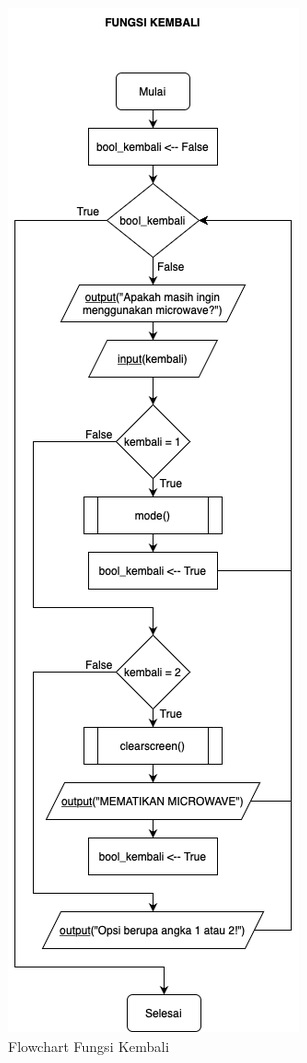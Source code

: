 \documentclass[conference]{IEEEtran}
\begin{document}
\begin{figure}[htbp]
    \centering
    \def\svgwidth{\columnwidth}
    \centerline{\includegraphics[scale=0.45]{Kembali.png}}
    \caption{Flowchart Fungsi Kembali}
    \label{fig5}
\end{figure}
\end{document}
